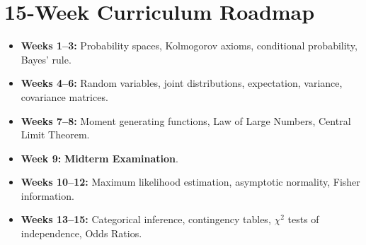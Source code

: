 \documentclass[11pt, a4paper]{article}
\begin{document}
\section*{15-Week Curriculum Roadmap}
\begin{itemize}\setlength{\itemsep}{2pt}
    \item \textbf{Weeks 1--3:} Probability spaces, Kolmogorov axioms, conditional probability, Bayes' rule.
    \item \textbf{Weeks 4--6:} Random variables, joint distributions, expectation, variance, covariance matrices.
    \item \textbf{Weeks 7--8:} Moment generating functions, Law of Large Numbers, Central Limit Theorem.
    \item \textbf{Week 9:} \textbf{Midterm Examination}.
    \item \textbf{Weeks 10--12:} Maximum likelihood estimation, asymptotic normality, Fisher information.
    \item \textbf{Weeks 13--15:} Categorical inference, contingency tables, $\chi^2$ tests of independence, Odds Ratios.
\end{itemize}
\end{document}
